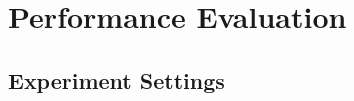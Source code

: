 \section{Performance Evaluation} %
\label{sec::OverhearingExperiments}
%



\subsection{Experiment Settings}
\label{sec::ExperimentSettings}

